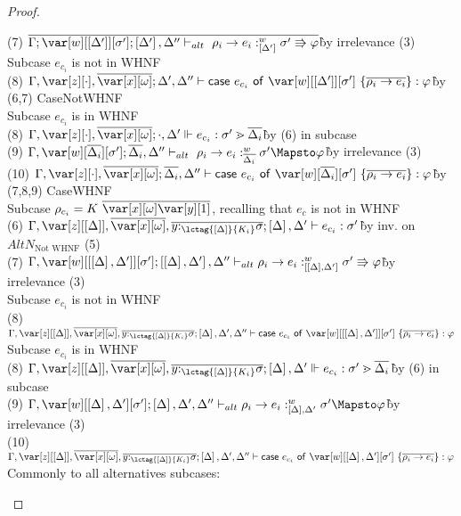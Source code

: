 \begin{proof}
\begin{tabbing}
    (7) $\ov{\G; \var[w][\irr{\D'}][\s']; \irr{\D'}, \D'' \vdash_{alt} \rho_i \to e_i :^w_{\irr{\D'}} \s' \Rrightarrow \vp}$\`by irrelevance (3)\\
    Subcase $e_{c_i}$ is not in WHNF\\
    (8) $\G,\z[\cdot],\ov{\xo}; \D',\D'' \vdash \ccase{e_{c_i}}{\var[w][\irr{\D'}][\s']~\{\ov{\rho_i \to e_i}\}} : \vp$\`by (6,7) CaseNotWHNF\\
    Subcase $e_{c_i}$ is in WHNF\\
    (8) $\G,\z[\cdot], \ov{\xo} ; \cdot, \D' \Vdash e_{c_i} : \s' \gtrdot \ov{\D_i}$\`by (6) in subcase\\
    (9) $\G, \var[w][\ov{\D_i}][\s']; \ov{\D_i}, \D'' \vdash_{alt} \rho_i \to e_i :^w_{\ov{\D_i}} \s' \Mapsto \vp$\`by irrelevance (3)\\
    (10) $\G,\z[\cdot],\ov{\xo}; \ov{\D_i},\D'' \vdash \ccase{e_{c_i}}{\var[w][\ov{\D_i}][\s']~\{\ov{\rho_i \to e_i}\}} : \vp$\`by (7,8,9) CaseWHNF\\
    Subcase $\rho_{c_i} = K~\ov{\xo}\ov{\y[1]}$, recalling that $e_c$ is not in WHNF\\
    (6) $\G,\z[\irr{\D}], \ov{\xo}, \ov{y{:}_{\lctag{\irr{\D}}{K_i}}\s}; \irr{\D},\D' \vdash e_{c_i} : \s'$\`by inv. on $AltN_\textrm{Not WHNF}$ (5)\\
    (7) $\G,\var[w][\irr{\irr{\D},\D'}][\s']; \irr{\irr{\D}, \D'}, \D'' \vdash_{alt} \rho_i \to e_i :^w_{\irr{\irr{\D},\D'}} \s' \Rrightarrow \vp$\`by irrelevance (3)\\
    Subcase $e_{c_i}$ is not in WHNF\\
    (8) $\G,\z[\irr{\D}], \ov{\xo}, \ov{y{:}_{\lctag{\irr{\D}}{K_i}}\s}; \irr{\D},\D',\D'' \vdash \ccase{e_{c_i}}{\var[w][\irr{\irr{\D},\D'}][\s']~\{\ov{\rho_i \to e_i}\}} : \vp$\\
    Subcase $e_{c_i}$ is in WHNF\\
    (8) $\G,\z[\irr{\D}], \ov{\xo}, \ov{y{:}_{\lctag{\irr{\D}}{K_i}}\s}; \irr{\D},\D' \Vdash e_{c_i} : \s' \gtrdot \ov{\D_i}$\`by (6) in subcase\\
    (9) $\G,\var[w][\irr{\D},\D'][\s']; \irr{\D}, \D', \D'' \vdash_{alt} \rho_i \to e_i :^w_{\irr{\D},\D'} \s' \Mapsto \vp$\`by irrelevance (3)\\
    (10) $\G,\z[\irr{\D}], \ov{\xo}, \ov{y{:}_{\lctag{\irr{\D}}{K_i}}\s}; \irr{\D},\D',\D'' \vdash \ccase{e_{c_i}}{\var[w][\irr{\D},\D'][\s']~\{\ov{\rho_i \to e_i}\}} : \vp$\\
    Commonly to all alternatives subcases:\\

\end{tabbing}
\end{proof}
